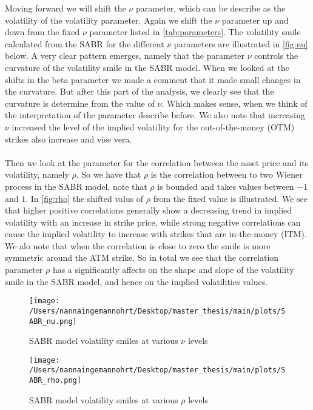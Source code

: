 \noindent
Moving forward we will shift the $\nu$ parameter, which can be describe as the volatility of the volatility parameter.
Again we shift the $\nu$ parameter up and down from the fixed $\nu$ parameter listed in \autoref{tab:parameters}.
The volatility smile calculated from the SABR for the different $\nu$ parameters are illustrated in \autoref{fig:nu} below.
A very clear pattern emerges, namely that the parameter $\nu$ controls the curvature of the volatility smile in
the SABR model. When we looked at the shifts in the beta parameter we made a comment that it made small changes in 
the curvature. But after this part of the analysis, we clearly see that the curvature is determine from the value
of $\nu$. Which makes sense, when we think of the interpretation of the parameter describe before.
We also note that increasing $\nu$  increased the level of the implied volatility for the 
out-of-the-money (OTM) strikes also increase and vise vera.
\\\\
Then we look at the parameter for the correlation between the asset price and its volatility, namely $\rho$.
So we have that $\rho$ is the correlation between to two Wiener process in the SABR model, note
that $\rho$ is bounded and takes values between $-1$ and $1$. In \autoref{fig:rho} the shifted valus of $\rho$
from the fixed value is illustrated. 
We see that higher positive correlations generally show a decreasing trend in implied volatility with an increase in strike price, 
while strong negative correlations can cause the implied volatility to increase with strikes that are in-the-money (ITM).
We alo note that when the correlation is close to zero the smile is more symmetric around the ATM strike. 
So in total we see that the correlation parameter $\rho$ has a significantly affects on the shape and slope of
the volatility smile in the SABR model, and hence on the implied volatilities values.
\begin{figure}[H]
    \centering
    \texttt{[image: /Users/nannaingemannohrt/Desktop/master\_thesis/main/plots/SABR\_nu.png]}
    \caption{SABR model volatility smiles at various $\nu$ levels}
    \label{fig:nu}
\end{figure}

\begin{figure}[H]
    \centering
    \texttt{[image: /Users/nannaingemannohrt/Desktop/master\_thesis/main/plots/SABR\_rho.png]}
    \caption{SABR model volatility smiles at various $\rho$ levels}
    \label{fig:rho}
\end{figure}

